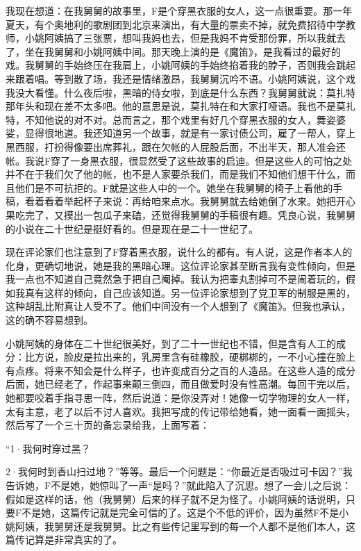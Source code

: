 我现在想道：在我舅舅的故事里，F是个穿黑衣服的女人，这一点很重要。那一年夏天，有个奥地利的歌剧团到北京来演出，有大量的票卖不掉，就免费招待中学教师，小姚阿姨搞了三张票，想叫我妈也去，但是我妈不肯受那份罪，所以我就去了，坐在我舅舅和小姚阿姨中间。那天晚上演的是《魔笛》，是我看过的最好的戏。我舅舅的手始终压在我肩上，小姚阿姨的手始终掐着我的脖子，否则我会跳起来跟着唱。等到散了场，我还是情绪激昂，我舅舅沉吟不语。小姚阿姨说，这个戏我没大看懂。什么夜后啦，黑暗的侍女啦，到底是什么东西？我舅舅就说：莫扎特那年头和现在差不太多吧。他的意思是说，莫扎特在和大家打哑语。我也不是莫扎特，不知他说的对不对。总而言之，那个戏里有好几个穿黑衣服的女人，舞姿婆娑，显得很地道。我还知道另一个故事，就是有一家讨债公司，雇了一帮人，穿上黑西服，打扮得像要出席葬礼，跟在欠帐的人屁股后面，不出半天，那人准会还帐。我说F穿了一身黑衣服，很显然受了这些故事的启迪。但是这些人的可怕之处并不在于我们欠了他的帐，也不是人家要杀我们，而是我们不知他们想干什么，而且他们是不可抗拒的。F就是这些人中的一个。她坐在我舅舅的椅子上看他的手稿，看着看着举起杯子来说：再给咱来点水。我舅舅就去给她倒了水来。她把开心果吃完了，又摸出一包瓜子来磕，还觉得我舅舅的手稿很有趣。凭良心说，我舅舅的小说在二十世纪是挺好看的。但是现在是二十一世纪了。 

现在评论家们也注意到了F穿着黑衣服，说什么的都有。有人说，这是作者本人的化身，更确切地说，她是我的黑暗心理。这位评论家甚至断言我有变性倾向，但是我一点也不知道自己竟然急于把自己阉掉。我认为把睾丸割掉可不是闹着玩的，假如我真有这样的倾向，自己应该知道。另一位评论家想到了党卫军的制服是黑的，这种胡乱比附真让人受不了。他们中间没有一个人想到了《魔笛》。但我也承认，这的确不容易想到。 

小姚阿姨的身体在二十世纪很美好，到了二十一世纪也不错，但是含有人工的成分：比方说，脸皮是拉出来的，乳房里含有硅橡胶，硬梆梆的，一不小心撞在脸上有点疼。将来不知会是什么样子，也许变成百分之百的人造品。在这些人造的成分后面，她已经老了，作起事来颠三倒四，而且做爱时没有性高潮。每回干完以后，她都要咬着手指寻思一阵，然后说道：是你没弄对！她像一切学物理的女人一样，太有主意，老了以后不讨人喜欢。我把写成的传记带给她看，她一面看一面摇头，然后写了一个三十页的备忘录给我，上面写着： 

“1·我何时穿过黑？ 

2·我何时到香山扫过地？”等等。最后一个问题是：“你最近是否吸过可卡因？”我告诉她，F不是她，她惊叫了一声“是吗？”就此陷入了沉思。想了一会儿之后说：假如是这样的话，他（我舅舅）后来的样子就不足为怪了。小姚阿姨的话说明，只要F不是她，这篇传记就是完全可信的了。这是个不低的评价，因为虽然F不是小姚阿姨，我舅舅还是我舅舅。比之有些传记里写到的每一个人都不是他们本人，这篇传记算是非常真实的了。 

